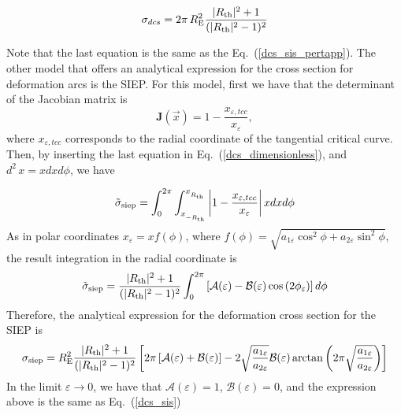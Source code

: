 \begin{equation}
\sigma_{dcs}=2\pi\,R^2_{\rm E} \dfrac{|R_{\rm th}|^2+1}{(|R_{\rm th}|^2-1)^2} \label{dcs_sis}
\end{equation}

Note that the last equation is the same as the Eq.~(\ref{dcs_sis_pertapp}). The other model that offers an analytical expression for the cross section for deformation arcs is the SIEP. For this model, first we have that the determinant of the Jacobian matrix is
\begin{equation}
\mathbf{J}(\vec{x})=1-\dfrac{x_{\varepsilon,tcc}}{x_{\varepsilon}}, \label{jacob_siep}
\end{equation}
where $x_{\varepsilon,tcc}$ corresponds to the radial coordinate of the tangential critical curve. Then, by inserting the last equation in Eq.~(\ref{dcs_dimensionless}), and $d^2\,x=xdx d\phi$, we have

\begin{equation}
\tilde{\sigma}_{\rm siep}= \int_{0}^{2\pi}\int_{x_{_{-R_{\rm th}}}}^{x_{_{R_{\rm th}}}}\left| 1-\dfrac{x_{\varepsilon,tcc}}{x_{\varepsilon}}\right| x dx d\phi 
\end{equation}
As in polar coordinates $x_{\varepsilon}=xf(\phi)$, where $f(\phi)=\sqrt{a_{1\varepsilon}\cos^2{\phi}+a_{2\varepsilon}\sin^2{\phi}}$, the result integration in the radial coordinate is
\begin{equation}
\tilde{\sigma}_{\rm siep}= \dfrac{|R_{\rm th}|^2+1}{(|R_{\rm th}|^2-1)^2} \int_{0}^{2\pi}\left[\mathcal{A}(\varepsilon)-\mathcal{B}(\varepsilon)\cos{(2\phi_\varepsilon)} \right] d\phi 
\end{equation}
Therefore, the analytical expression for the deformation cross section for the SIEP is
 \begin{equation}
\sigma_{\rm siep}= R^2_{\rm E}\dfrac{|R_{\rm th}|^2+1}{(|R_{\rm th}|^2-1)^2} \left[2\pi\left[\mathcal{A}(\varepsilon)+\mathcal{B}(\varepsilon)\right]-2\sqrt{\dfrac{a_{1\varepsilon}}{a_{2\varepsilon}}}\mathcal{B}(\varepsilon)\arctan{\left(2\pi\sqrt{\dfrac{a_{1\varepsilon}}{a_{2\varepsilon}}}\right)} \right]
\end{equation}
In the limit $\varepsilon \rightarrow 0$, we have that $\mathcal{A}(\varepsilon)=1$, $\mathcal{B}(\varepsilon)=0$, and the expression above is the same as Eq.~(\ref{dcs_sis})

